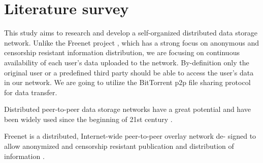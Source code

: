 \section{Literature survey}

This study aims to research and develop a self-organized distributed
data storage network. Unlike the Freenet project \cite{freenet}, which
has a strong focus on anonymous and censorship resistant information
distribution, we are focusing on continuous availability of each user's
data uploaded to the network. By-definition only the original user
or a predefined third party should be able to access the user's data
in our network. We are going to utilize the BitTorrent \cite{bittorrent-ma}
p2p file sharing protocol for data transfer. 


Distributed peer-to-peer data storage networks have a great potential and have
been widely used since the beginning of 21st century
\cite{chord-01}.

Freenet is a distributed, Internet-wide peer-to-peer overlay network de-
signed to allow anonymized and censorship resistant publication and
distribution of information \cite{dark-freenet}.